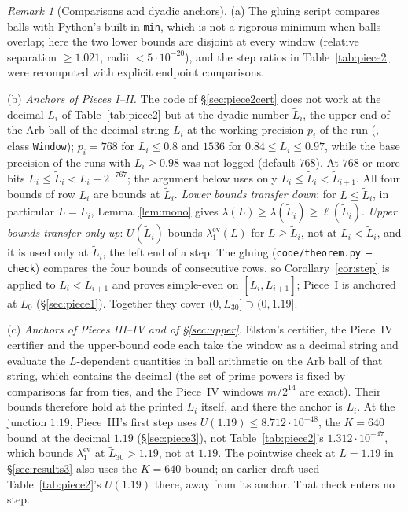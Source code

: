 \documentclass[11pt]{amsart}
\newcommand{\ev}{\mathrm{ev}}
\newcommand{\file}[1]{{\small\path{#1}}}
\newcommand{\e}[1]{\cdot 10^{#1}}
\theoremstyle{definition}
\theoremstyle{remark}
\newtheorem{remark}[theorem]{Remark}
\numberwithin{equation}{section}
\begin{document}
\begin{remark}[Comparisons and dyadic anchors]\label{rem:dyadic}
(a) The gluing script compares balls with Python's built-in \texttt{min}, which is not a rigorous minimum when balls overlap; here the two lower bounds are disjoint at every window (relative separation $\ge1.021$, radii $<5\e{-20}$), and the step ratios in Table~\ref{tab:piece2} were recomputed with explicit endpoint comparisons.

(b) \emph{Anchors of Pieces I--II.} The code of \S\ref{sec:piece2cert} does not work at the decimal $L_i$ of Table~\ref{tab:piece2} but at the dyadic number $\tilde L_i$, the upper end of the Arb ball of the decimal string $L_i$ at the working precision $p_i$ of the run (\file{code/certify.py}, class \texttt{Window}); $p_i=768$ for $L_i\le0.8$ and $1536$ for $0.84\le L_i\le0.97$, while the base precision of the runs with $L_i\ge0.98$ was not logged (default $768$). At $768$ or more bits $L_i\le\tilde L_i<L_i+2^{-767}$; the argument below uses only $L_i\le\tilde L_i<\tilde L_{i+1}$. All four bounds of row $L_i$ are bounds at $\tilde L_i$. \emph{Lower bounds transfer down}: for $L\le\tilde L_i$, in particular $L=L_i$, Lemma~\ref{lem:mono} gives $\lambda(L)\ge\lambda(\tilde L_i)\ge\ell(\tilde L_i)$. \emph{Upper bounds transfer only up}: $U(\tilde L_i)$ bounds $\lambda_1^\ev(L)$ for $L\ge\tilde L_i$, not at $L_i<\tilde L_i$, and it is used only at $\tilde L_i$, the left end of a step. The gluing (\texttt{code/theorem.py --check}) compares the four bounds of consecutive rows, so Corollary~\ref{cor:step} is applied to $\tilde L_i<\tilde L_{i+1}$ and proves simple-even on $[\tilde L_i,\tilde L_{i+1}]$; Piece~I is anchored at $\tilde L_0$ (\S\ref{sec:piece1}). Together they cover $(0,\tilde L_{30}]\supset(0,1.19]$.

(c) \emph{Anchors of Pieces III--IV and of \S\ref{sec:upper}.} Elston's certifier, the Piece~IV certifier and the upper-bound code each take the window as a decimal string and evaluate the $L$-dependent quantities in ball arithmetic on the Arb ball of that string, which contains the decimal (the set of prime powers is fixed by comparisons far from ties, and the Piece~IV windows $m/2^{14}$ are exact). Their bounds therefore hold at the printed $L_i$ itself, and there the anchor is $L_i$. At the junction $1.19$, Piece~III's first step uses $U(1.19)\le8.712\e{-48}$, the $K=640$ bound at the decimal $1.19$ (\S\ref{sec:piece3}), not Table~\ref{tab:piece2}'s $1.312\e{-47}$, which bounds $\lambda_1^\ev$ at $\tilde L_{30}>1.19$, not at $1.19$. The pointwise check at $L=1.19$ in \S\ref{sec:results3} also uses the $K=640$ bound; an earlier draft used Table~\ref{tab:piece2}'s $U(1.19)$ there, away from its anchor. That check enters no step.
\end{remark}
\end{document}
